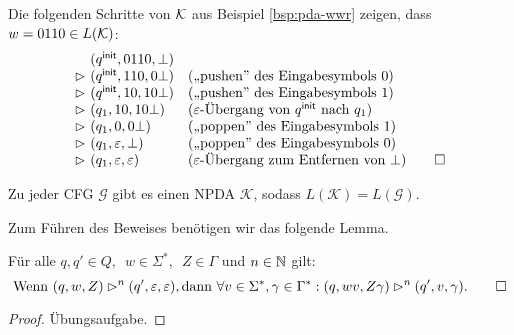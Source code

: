 \begin{Bsp*}
  Die folgenden Schritte von $\mathcal{K}$ aus Beispiel \ref{bsp:pda-wwr} zeigen, dass $w = 0110 \in L(\mathcal{K})$:
  \begin{displaymath}
  \begin{array}{r@{\ }ll}
    & (\qinit, 0110, \bot) \\
    \ConfRel & (\qinit, 110, 0\bot)  &\text{(,,pushen'' des Eingabesymbols $0$)}\\
    \ConfRel & (\qinit, 10, 10\bot)  &\text{(,,pushen'' des Eingabesymbols $1$)}\\
    \ConfRel & (q_1, 10, 10\bot)  &\text{($\Eps$-Übergang von $\qinit$ nach $q_1$)} \\
    \ConfRel & (q_1, 0, 0\bot)  &\text{(,,poppen'' des Eingabesymbols $1$)}\\
    \ConfRel & (q_1,\Eps, \bot) &\text{(,,poppen'' des Eingabesymbols $0$)}\\
    \ConfRel & (q_1, \Eps, \Eps) &\text{($\Eps$-Übergang zum Entfernen von $\bot$)}
    \qedhere
  \end{array}
\end{displaymath}
\end{Bsp*}

\begin{lemma}\label{lem:4.cfgToNpda}
 Zu jeder \ac{CFG} $\mathcal{G}$ gibt es einen \ac{NPDA} $\mathcal{K}$, sodass $L(\mathcal{K})=L(\mathcal{G})$.
\end{lemma}

  Zum Führen des Beweises benötigen wir das folgende Lemma.

\begin{lemma}\label{lem:4.mehrKeller}
Für alle $q,q' \in Q,\enspace w \in \Sigma^*,\enspace Z \in \Gamma$ und $n \in \mathbb{N}$ gilt:
  \begin{displaymath}
    \text{Wenn } (q,w,Z) \rhd^n (q', \varepsilon, \varepsilon), \text{dann } \forall v \in \Sigma^*, \gamma \in \Gamma^*: (q, wv, Z\gamma) \rhd^n (q', v, \gamma).
    \qedhere
  \end{displaymath}
\end{lemma}
\begin{proof}
Übungsaufgabe.
\end{proof}


